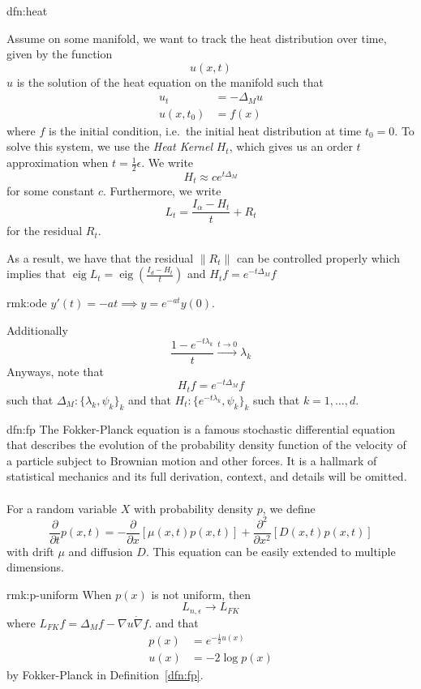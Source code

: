 \documentclass[12pt]{article}
\DeclareMathOperator*{\eig}{eig}
\begin{document}
\begin{dfn}{dfn:heat}

  Assume on some manifold, we want to track the heat distribution over time, given by the function
  \[
  u(x, t)
  \]
  \( u \) is the solution of the heat equation on the manifold such that
  \begin{align*}
   u_{t} &= -\Delta_M u \\
  	u(x, t_{0}) &= f(x)
  \end{align*}
where \( f \) is the initial condition, i.e.\ the initial heat distribution at time \( t_{0} = 0 \). To solve this system, we use the \textit{Heat Kernel} \( H_t \), which gives us an order \( t \) approximation when \( t = \frac{1}{2} \epsilon \).
We write
\[
H_{t} \approx c e^{t \Delta_{M}}
\]
for some constant \( c \).
Furthermore, we write
\[
L_t = \frac{I_{\alpha} - H_t}{t} + R_t
\]
for the residual \( R_{t} \).
\end{dfn}
As a result, we have that the residual $ \| R_t \| $ can be controlled properly
which implies that $ \eig{L_t} = \eig{( \frac{I_d - H_t}{t} )} $
and $ H_t f = e^{-t \Delta_M} f $
\begin{rmk}{rmk:ode}
$ y'(t) = -at \implies y = e^{-at} y(0) $.
\end{rmk}
Additionally
\[
\frac{1 - e^{-t\lambda_k}}{t} \xrightarrow{t \to 0} \lambda_k
\]
Anyways, note that
\[
H_t f = e^{-t \Delta_M} f
\]
such that $ \Delta_M : \{ \lambda_k, \psi_k \}_k $
and that $ H_t : \{ e^{-t \lambda_k}, \psi_k \}_k $
such that $ k = 1, \ldots, d $.
\begin{dfn}{dfn:fp}
  The Fokker-Planck equation is a famous stochastic differential equation that describes the evolution of the probability density function of the velocity of a particle subject to Brownian motion and other forces.
  It is a hallmark of statistical mechanics and its full derivation, context, and details will be omitted.~\cite{schwabl-2006}
  \\ \\
  For a random variable \( X \) with probability density \( p \), we define
  \[
  \frac{\partial}{\partial t} p(x, t) = -\frac{\partial}{\partial x}[\mu(x, t)p(x, t)] + \frac{\partial^2}{\partial x^2}[D(x, t)p(x, t)]
  \]
  with drift \( \mu \) and diffusion \( D \).
  This equation can be easily extended to multiple dimensions.~\cite{wiki:fp}
\end{dfn}
\begin{rmk}[$ p(x) $ Uniformity]{rmk:p-uniform}
	When $ p(x) $ is not uniform, then
	\[
	L_{n, \epsilon} \to L_{FK}
	\]
	where $ L_{FK} f = \Delta_M f - \nabla u \dot \nabla f $.
	and that
	\begin{align*}
		p(x) &= e^{-\frac{1}{2} u(x)} \\
		u(x) &= -2 \log{p(x)}
	\end{align*}
	by Fokker-Planck in Definition~\ref{dfn:fp}.
\end{rmk}
\end{document}

